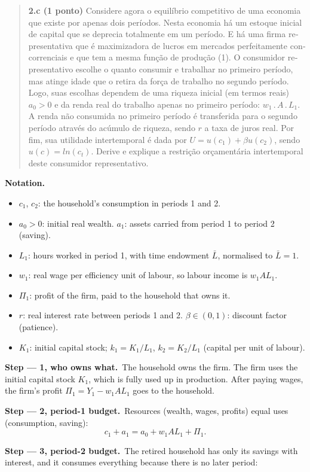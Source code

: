 \documentclass[11pt,a4paper]{article}
\newcommand{\enunciado}[1]{\par\smallskip\noindent{\footnotesize\textit{Statement, as printed in the exam:}}%
  \begin{quote}\small\begin{otherlanguage}{portuguese}#1\end{otherlanguage}\end{quote}}
\newcommand{\itemq}[1]{\par\medskip\needspace{6\baselineskip}\enunciado{#1}}
\newcommand{\passo}[1]{\par\smallskip\noindent\textbf{Step --- #1.}~}
\newenvironment{notacao}{\par\smallskip\noindent\textbf{Notation.}\begin{itemize}[leftmargin=1.4em,topsep=1pt,itemsep=0pt]\small}{\end{itemize}}
\begin{document}
\itemq{\textbf{2.c (1 ponto)} Considere agora o equilíbrio competitivo de uma economia que existe por
apenas dois períodos. Nesta economia há um estoque inicial de capital que se deprecia totalmente em
um período. E há uma firma representativa que é maximizadora de lucros em mercados perfeitamente
concorrenciais e que tem a mesma função de produção (1). O consumidor representativo escolhe o
quanto consumir e trabalhar no primeiro período, mas atinge idade que o retira da força de trabalho
no segundo período. Logo, suas escolhas dependem de uma riqueza inicial (em termos reais) $a_0>0$ e
da renda real do trabalho apenas no primeiro período: $w_1\,.\,A\,.\,L_1$. A renda não consumida no
primeiro período é transferida para o segundo período através do acúmulo de riqueza, sendo $r$ a
taxa de juros real. Por fim, sua utilidade intertemporal é dada por $U=u(c_1)+\beta u(c_2)$, sendo
$u(c)=ln(c_t)$. Derive e explique a restrição orçamentária intertemporal deste consumidor
representativo.}
\begin{notacao}
\item $c_1$, $c_2$: the household's consumption in periods 1 and 2.
\item $a_0>0$: initial real wealth. $a_1$: assets carried from period 1 to period 2 (saving).
\item $L_1$: hours worked in period 1, with time endowment $\bar L$, normalised to $\bar L=1$.
\item $w_1$: real wage per efficiency unit of labour, so labour income is $w_1AL_1$.
\item $\Pi_1$: profit of the firm, paid to the household that owns it.
\item $r$: real interest rate between periods 1 and 2. $\beta\in(0,1)$: discount factor
(patience).
\item $K_1$: initial capital stock; $k_1=K_1/L_1$, $k_2=K_2/L_1$ (capital per unit of labour).
\end{notacao}
\passo{1, who owns what}The household owns the firm. The firm uses the initial capital stock $K_1$,
which is fully used up in production. After paying wages, the firm's profit
$\Pi_1=Y_1-w_1AL_1$ goes to the household.
\passo{2, period-1 budget}Resources (wealth, wages, profits) equal uses (consumption, saving):
\begin{equation}
c_1+a_1=a_0+w_1AL_1+\Pi_1. \label{e21}
\end{equation}
\passo{3, period-2 budget}The retired household has only its savings with interest, and it consumes
everything because there is no later period:
\end{document}

